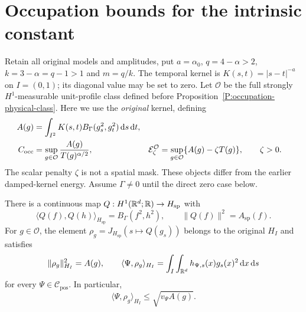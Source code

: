 \section{Occupation bounds for the intrinsic constant}
\label{S:intrinsic-occupation-ceiling}

Retain all original models and amplitudes, put $a = \alpha_0$, $q = 4-\alpha >
2$, $k = 3-\alpha = q-1 > 1$ and $m = q/k$. The temporal kernel is $K(s,t) =
|s-t|^{-a}$ on $I = (0,1)$; its diagonal value may be set to zero. Let
$\mathcal{O}$ be the full strongly $H^1$-measurable unit-profile class defined
before Proposition~\ref{P:occupation-physical-class}. Here we use the
\emph{original} kernel, defining
\begin{equation}\label{E:raw-occupation-definitions}
  \begin{aligned}
    A(g)&=\int_{I^2}K(s,t)B_\Gamma(g_s^2,g_t^2)\,\mathrm{d} s\,\mathrm{d} t,\\
    C_{\rm occ}&=\sup_{g\in\mathcal{O}}
    \frac{A(g)}{T(g)^{\alpha/2}},&
    \mathcal{E}_\zeta^{\mathcal{O}}
    &=\sup_{g\in\mathcal{O}}\{A(g)-\zeta T(g)\},\qquad \zeta>0.
  \end{aligned}
\end{equation}
The scalar penalty $\zeta$ is not a spatial mask. These objects differ from the
earlier damped-kernel energy. Assume $\Gamma \ne 0$ until the direct zero case
below.

\begin{lemma}
  \label{L:occupation-raw-square}
  There is a continuous map $Q:H^1(\mathbb{R}^d;\mathbb{R}) \to H_{\mathrm{sp}}$ with
  \[
    \langle Q(f),Q(h)\rangle_{H_{\mathrm{sp}}}
    =B_\Gamma(f^2,h^2),\qquad
    \|Q(f)\|^2=A_{\mathrm{sp}}(f).
  \]
  For $g \in \mathcal{O}$, the element $\rho_g = J_{H_{\mathrm{sp}}}(s\mapsto
  Q(g_s))$ belongs to the original $H_I$ and satisfies
  \begin{equation}\label{E:occupation-raw-identities}
    \|\rho_g\|_{H_I}^2=A(g),\qquad
    \langle\Psi,\rho_g\rangle_{H_I}
    =\int_I\int_{\mathbb{R}^d}h_{\Psi,s}(x)g_s(x)^2\,\mathrm{d} x\,\mathrm{d} s
  \end{equation}
  for every $\Psi \in \mathcal{C}_{\mathrm{pos}}$. In particular,
  \[
    \langle\Psi,\rho_g\rangle_{H_I}\le\sqrt{v_\Psi A(g)}.
  \]
\end{lemma}

